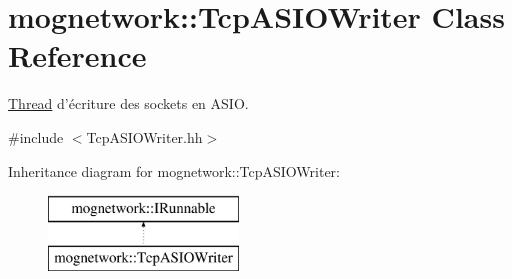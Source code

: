 \hypertarget{classmognetwork_1_1_tcp_a_s_i_o_writer}{\section{mognetwork\-:\-:Tcp\-A\-S\-I\-O\-Writer Class Reference}
\label{classmognetwork_1_1_tcp_a_s_i_o_writer}
}


\hyperlink{classmognetwork_1_1_thread}{Thread} d'écriture des sockets en A\-S\-I\-O.  




{\ttfamily \#include $<$Tcp\-A\-S\-I\-O\-Writer.\-hh$>$}

Inheritance diagram for mognetwork\-:\-:Tcp\-A\-S\-I\-O\-Writer\-:\begin{figure}[H]
\begin{center}
\leavevmode
\includegraphics[height=2.000000cm]{classmognetwork_1_1_tcp_a_s_i_o_writer}
\end{center}
\end{figure}

